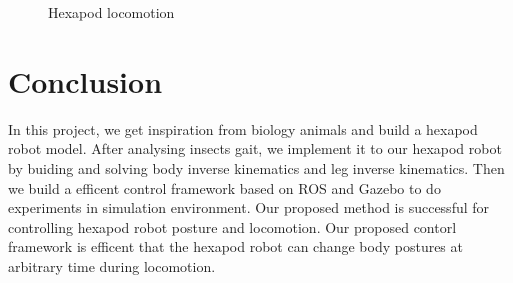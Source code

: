 \documentclass[conference]{IEEEtran}
\begin{document}
\begin{figure}
    \centering
    \caption{Hexapod locomotion}
    \label{fig1111}
\end{figure}

\section{Conclusion}

In this project, we get inspiration from biology animals and build a hexapod robot model. After analysing insects gait, we implement it to our hexapod robot by buiding and solving body inverse kinematics and leg inverse kinematics. Then we build a efficent control framework based on ROS and Gazebo to do experiments in simulation environment. Our proposed method is successful for controlling hexapod robot posture and locomotion. Our proposed contorl framework is efficent that the hexapod robot can change body postures at arbitrary time during locomotion.
\end{document}
